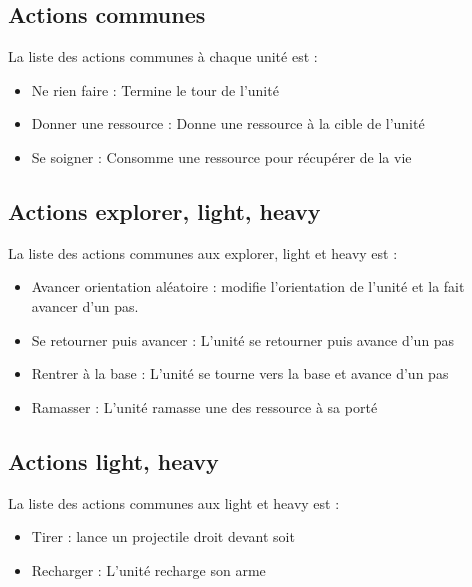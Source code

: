 \documentclass{report}
\begin{document}
\paragraph{}
\subsection{Actions communes}
La liste des actions communes à chaque unité est :
\begin{itemize}
\item Ne rien faire : Termine le tour de l'unité
\item Donner une ressource : Donne une ressource à la cible de l'unité
\item Se soigner : Consomme une ressource pour récupérer de la vie
\end{itemize}
\subsection{Actions explorer, light, heavy}
La liste des actions communes aux explorer, light et heavy est :
\begin{itemize}
\item Avancer orientation aléatoire : modifie l'orientation de l'unité et la fait avancer d'un pas.
\item Se retourner puis avancer : L'unité se retourner puis avance d'un pas
\item Rentrer à la base : L'unité se tourne vers la base et avance d'un pas
\item Ramasser : L'unité ramasse une des ressource à sa porté
\end{itemize}
\subsection{Actions light, heavy}
La liste des actions communes aux light et heavy est :
\begin{itemize}
\item Tirer : lance un projectile droit devant soit
\item Recharger : L'unité recharge son arme
\end{itemize}
\end{document}
